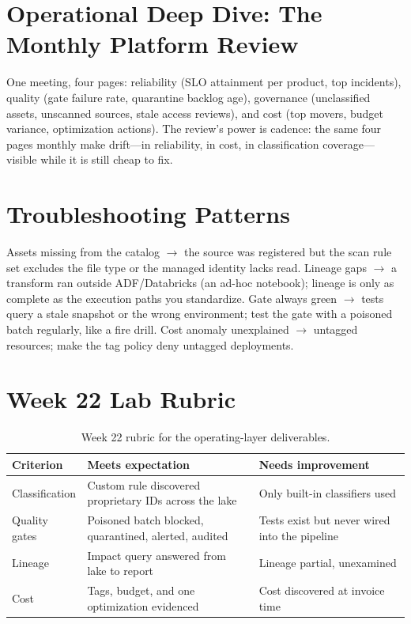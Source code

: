 \section{Operational Deep Dive: The Monthly Platform Review}
One meeting, four pages: reliability (SLO attainment per product, top incidents), quality (gate failure rate, quarantine backlog age), governance (unclassified assets, unscanned sources, stale access reviews), and cost (top movers, budget variance, optimization actions). The review's power is cadence: the same four pages monthly make drift---in reliability, in cost, in classification coverage---visible while it is still cheap to fix.

\section{Troubleshooting Patterns}
Assets missing from the catalog $\rightarrow$ the source was registered but the scan rule set excludes the file type or the managed identity lacks read. Lineage gaps $\rightarrow$ a transform ran outside ADF/Databricks (an ad-hoc notebook); lineage is only as complete as the execution paths you standardize. Gate always green $\rightarrow$ tests query a stale snapshot or the wrong environment; test the gate with a poisoned batch regularly, like a fire drill. Cost anomaly unexplained $\rightarrow$ untagged resources; make the tag policy deny untagged deployments.

\section{Week 22 Lab Rubric}
\begin{table}[H]
\centering
\small
\begin{tabular}{@{}p{3.2cm}p{5.0cm}p{5.0cm}@{}}
\toprule
\textbf{Criterion} & \textbf{Meets expectation} & \textbf{Needs improvement} \\
\midrule
Classification & Custom rule discovered proprietary IDs across the lake & Only built-in classifiers used \\
Quality gates & Poisoned batch blocked, quarantined, alerted, audited & Tests exist but never wired into the pipeline \\
Lineage & Impact query answered from lake to report & Lineage partial, unexamined \\
Cost & Tags, budget, and one optimization evidenced & Cost discovered at invoice time \\
\bottomrule
\end{tabular}
\caption{Week 22 rubric for the operating-layer deliverables.}
\label{tab:ch22-rubric}
\end{table}

